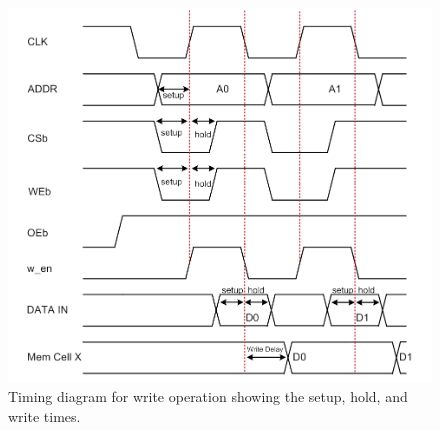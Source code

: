 \begin{figure}[tb]
\centering
\includegraphics[scale=.9]{./figs/timing_write.pdf}
\caption{Timing diagram for write operation showing the setup, hold, and write times.}
\label{fig:write}
\end{figure}



